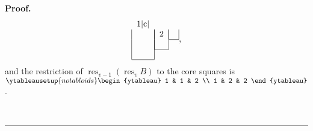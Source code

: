 \documentclass[numbers=enddot,12pt,final,onecolumn,notitlepage]{scrartcl}%
\theoremstyle{definition}
\newenvironment{proof}[1][Proof]{\noindent\textbf{#1.} }{\ \rule{0.5em}{0.5em}}
\newenvironment{vershort}{}{}
\begin{document}
\begin{vershort}
\begin{proof}
\begin{equation}
\begin{tabular}{ccc}
{1}{|c|}{} \\
\multicolumn{1}{|c|}{} & \multicolumn{1}{|c|}{2} & \multicolumn{1}{|c|}{} \\
\cline{3-3} \multicolumn{1}{|c|}{} & \multicolumn{1}{|c|}{} \\
\cline{2-2} \multicolumn{1}{|c|}{} \\
\cline{1-1}
\end{tabular}%
, \label{pf.prop.conflict-resolution.hyps.short.D}%
\end{equation}
and the restriction of $\operatorname*{res}\nolimits_{v-1}\left(
\operatorname*{res}\nolimits_{v}B\right)  $ to the core squares is $%
\ytableausetup{notabloids}
\begin{ytableau}
1 & 1 & 2 \\
1 & 2 & 2
\end{ytableau}%
$.


\end{proof}
\end{vershort}
\end{document}
